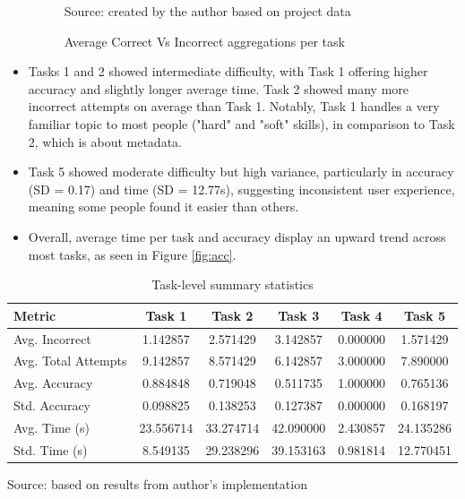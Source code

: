\begin{itemize}
\begin{figure}[hbtp]
        \caption{Average Correct Vs Incorrect aggregations per task}
        \label{fig:corr_incorr}
        {\raggedright \small{Source: created by the author based on project data}\par}
        \end{figure}
        \item Tasks 1 and 2 showed intermediate difficulty, with Task 1 offering higher accuracy and slightly longer average time. 
        Task 2 showed many more incorrect attempts on average than Task 1. 
        Notably, Task 1 handles a very familiar topic to most people ("hard" and "soft" skills), in comparison to Task 2, which is about metadata. 
        \item Task 5 showed moderate difficulty but high variance, particularly in accuracy (SD = 0.17) and time (SD = 12.77s), suggesting inconsistent user experience, meaning some people found it easier than others.
        \item Overall, average time per task and accuracy display an upward trend across most tasks, as seen in Figure \ref{fig:acc}.
\end{itemize}

\begin{table}[ht]
\centering
\captionsetup{justification=raggedright, singlelinecheck=false}
\caption{Task-level summary statistics}
\begin{tabular}{lccccc}
\toprule
\textbf{Metric} & \textbf{Task 1} & \textbf{Task 2} & \textbf{Task 3} & \textbf{Task 4} & \textbf{Task 5} \\
\midrule
Avg. Incorrect     & 1.142857 & 2.571429 & 3.142857 & 0.000000 & 1.571429 \\
Avg. Total Attempts& 9.142857 & 8.571429 & 6.142857 & 3.000000 & 7.890000 \\
Avg. Accuracy      & 0.884848 & 0.719048 & 0.511735 & 1.000000 & 0.765136 \\
Std. Accuracy      & 0.098825 & 0.138253 & 0.127387 & 0.000000 & 0.168197 \\
Avg. Time (s)      & 23.556714 & 33.274714 & 42.090000 & 2.430857 & 24.135286 \\
Std. Time (s)      & 8.549135 & 29.238296 & 39.153163 & 0.981814 & 12.770451 \\
\bottomrule
\end{tabular}
\label{tab:task_summary_vertical}
\end{table}
{\raggedright \small{Source: based on results from author's implementation}\par}

